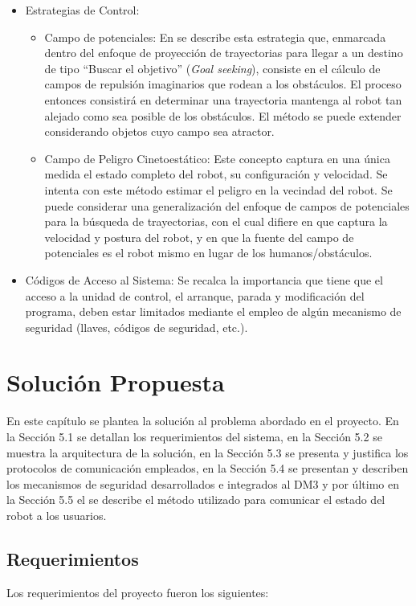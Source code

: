 \documentclass[withindex,glossary]{cam-thesis}
\begin{document}
\begin{itemize}
\begin{itemize}
  \end {itemize}
\item Estrategias de Control:
  \begin{itemize}
  	\item Campo de potenciales: En \cite{MartinezSisto2009} se describe esta estrategia que, enmarcada dentro del enfoque de proyección de trayectorias para llegar a un destino de tipo ``Buscar el objetivo'' (\textit{Goal seeking}), consiste en el cálculo de campos de repulsión imaginarios que rodean a los obstáculos. El proceso entonces consistirá en determinar una trayectoria mantenga al robot tan alejado como sea posible de los obstáculos. El método se puede extender considerando objetos cuyo campo sea atractor.
  	\item Campo de Peligro Cinetoestático: Este concepto captura en una única medida el estado completo del robot, su configuración y velocidad. Se intenta con este método  estimar el peligro en la vecindad del robot. Se puede considerar una generalización del enfoque de campos de potenciales para la búsqueda de trayectorias, con el cual difiere en que captura la velocidad y postura del robot, y en que la fuente del campo de potenciales es el robot mismo en lugar de los humanos/obstáculos.
  \end{itemize}
\item Códigos de Acceso al Sistema: Se recalca la importancia que tiene que el acceso a la unidad de control, el arranque, parada y modificación del programa, deben estar limitados mediante el empleo de algún mecanismo de seguridad (llaves, códigos de seguridad, etc.).
\end{itemize}

\chapter{Solución Propuesta}
En este capítulo se plantea la solución al problema abordado en el proyecto. En la Sección 5.1 se detallan los requerimientos del sistema, en la Sección 5.2 se muestra la arquitectura de la solución, en la Sección 5.3 se presenta y justifica los protocolos de comunicación empleados, en la Sección 5.4 se presentan y describen los mecanismos de seguridad desarrollados e integrados al DM3 y por último en la Sección 5.5 el se describe el método utilizado para comunicar el estado del robot a los usuarios.

\section{Requerimientos} \label{sec:Sol Prop :: Requerimientos}
Los requerimientos del proyecto fueron los siguientes:
\end{document}
